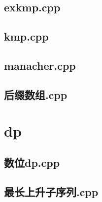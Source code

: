 \subsection{exkmp.cpp}

\subsection{kmp.cpp}

\subsection{manacher.cpp}

\subsection{后缀数组.cpp}

\section{dp}
\subsection{数位dp.cpp}

\subsection{最长上升子序列.cpp}

